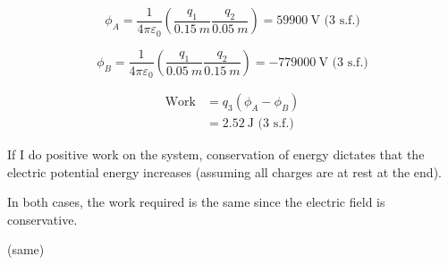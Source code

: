 \begin{solution}
    \begin{subsolution}
        \[\phi_A = \frac{1}{4 \pi \varepsilon_0} \left(\frac{q_1}{\qty{0.15}{m}}\frac{q_2}{\qty{0.05}{m}}\right) = \boxed{\qty{59900}{\V}}\text{ (3 s.f.)}\]
    \end{subsolution}
    \begin{subsolution}
        \[\phi_B = \frac{1}{4 \pi \varepsilon_0} \left(\frac{q_1}{\qty{0.05}{m}}\frac{q_2}{\qty{0.15}{m}}\right) = \boxed{\qty{-779000}{\V}}\text{ (3 s.f.)}\]
    \end{subsolution}
    \begin{subsolution}
        \begin{align}
            \text{Work} &= q_3 \left(\phi_A - \phi_B\right) \\
                        & = \boxed{\qty{2.52}{\J}}\text{ (3 s.f.)}
        \end{align}
    \end{subsolution}
    \begin{subsolution}
        If I do positive work on the system, conservation of energy dictates that the electric potential energy increases (assuming all charges are at rest at the end).
    \end{subsolution}
    \begin{subsolution}
    In both cases, the work required is the same since the electric field is conservative.
    \end{subsolution}
    \begin{subsolution}
    (same)
    \end{subsolution}
\end{solution}

